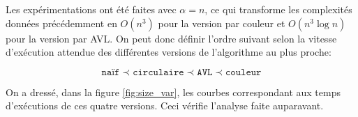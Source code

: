 \documentclass[12pt,a4paper]{article}
\begin{document}
Les exp\'erimentations ont \'et\'e faites avec $\alpha = n$,
ce qui transforme les complexit\'es donn\'ees pr\'ec\'edemment en $O(n^3)$ pour 
la version par couleur et $O(n^3\log n)$ pour la version par AVL. On peut donc 
d\'efinir l'ordre suivant selon la vitesse d'ex\'ecution attendue des 
diff\'erentes versions de l'algorithme au plus proche:

\begin{equation*}
  \texttt{na\"if} \prec \texttt{circulaire} \prec \texttt{AVL} \prec 
  \texttt{couleur}
\end{equation*}

On a dress\'e, dans la figure \ref{fig:size_var}, les courbes correspondant aux 
temps d'ex\'ecutions de ces quatre versions. Ceci v\'erifie l'analyse faite 
auparavant.

\end{document}
